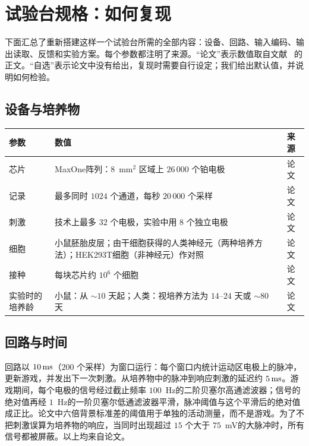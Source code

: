 \section{试验台规格：如何复现}
\label{sec:dishspec}

下面汇总了重新搭建这样一个试验台所需的全部内容：设备、回路、输入编码、输出读取、反馈和实验方案。每个参数都注明了来源。“论文”表示数值取自文献~\cite{Kagan2022} 的正文。“自选”表示论文中没有给出，复现时需要自行设定；我们给出默认值，并说明如何检验。

\subsection*{设备与培养物}

\begin{center}
\footnotesize
\setlength{\tabcolsep}{4pt}
\renewcommand{\arraystretch}{1.15}
\begin{tabular}{>{\raggedright}p{4.0cm}>{\raggedright}p{6.9cm}>{\raggedright\arraybackslash}p{1.6cm}}
\toprule
参数 & 数值 & 来源 \\
\midrule
芯片 & MaxOne阵列：$8$~mm$^2$ 区域上 $26\,000$ 个铂电极 & 论文 \\
记录 & 最多同时 $1024$ 个通道，每秒 $20\,000$ 个采样 & 论文 \\
刺激 & 技术上最多 $32$ 个电极，实验中用 $8$ 个独立电极 & 论文 \\
细胞 & 小鼠胚胎皮层；由干细胞获得的人类神经元（两种培养方法）；HEK293T细胞（非神经元）作对照 & 论文 \\
接种 & 每块芯片约 $10^6$ 个细胞 & 论文 \\
实验时的培养龄 & 小鼠：从 $\sim10$ 天起；人类：视培养方法为 $14$--$24$ 天或 $\sim80$ 天 & 论文 \\
\bottomrule
\end{tabular}
\end{center}

\subsection*{回路与时间}

回路以 $10\,\text{ms}$（$200$ 个采样）为窗口运行：每个窗口内统计运动区电极上的脉冲，更新游戏，并发出下一次刺激。从培养物中的脉冲到响应刺激的延迟约 $5\,\text{ms}$。游戏期间，每个电极的信号经过截止频率 $100$~Hz的二阶贝塞尔高通滤波器；信号的绝对值再经 $1$~Hz的一阶贝塞尔低通滤波器平滑，脉冲阈值与这个平滑后的绝对值成正比。论文中六倍背景标准差的阈值用于单独的活动测量，而不是游戏。为了不把刺激误算为培养物的响应，当同时出现超过 $15$ 个大于 $75$~mV的大脉冲时，所有信号都被屏蔽。以上均来自论文。


